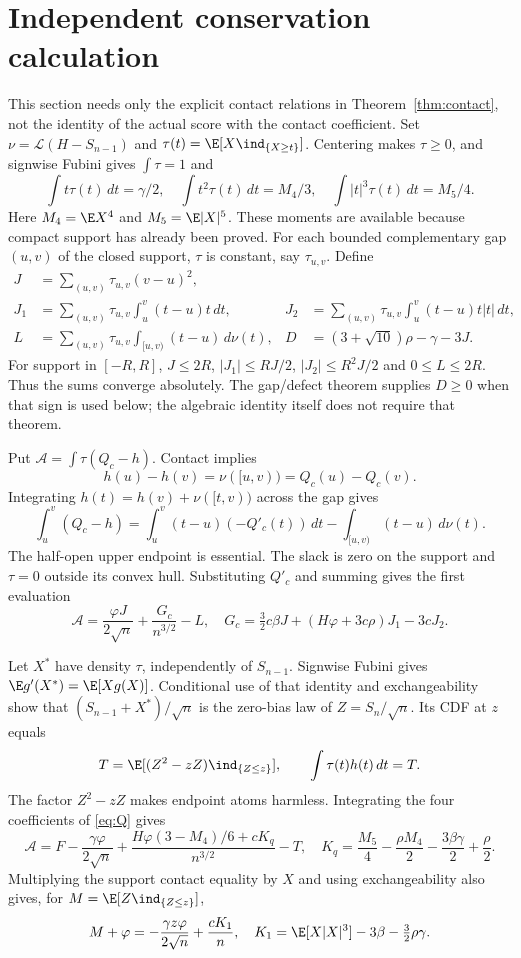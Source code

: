 \section{Independent conservation calculation}
This section needs only the explicit contact relations in
Theorem~\ref{thm:contact}, not the identity of the actual score with the
contact coefficient. Set $\nu=\mathcal L(H-S_{n-1})$ and
$\tau(t)=\E[X\ind_{\{X\ge t\}}]$. Centering makes $\tau\ge0$, and
signwise Fubini gives $\int\tau=1$ and
\[
 \int t\tau(t)\,dt=\gamma/2,\quad
 \int t^2\tau(t)\,dt=M_4/3,\quad
 \int |t|^3\tau(t)\,dt=M_5/4.

\]
Here $M_4=\E X^4$ and $M_5=\E|X|^5$.
These moments are available because compact support has already been
proved. For each bounded complementary gap $(u,v)$ of the closed support,
$\tau$ is constant, say $\tau_{u,v}$. Define
\begin{align*}
 J&=\sum_{(u,v)}\tau_{u,v}(v-u)^2,\\
 J_1&=\sum_{(u,v)}\tau_{u,v}\int_u^v(t-u)t\,dt,
 &J_2&=\sum_{(u,v)}\tau_{u,v}\int_u^v(t-u)t|t|\,dt,\\
 L&=\sum_{(u,v)}\tau_{u,v}\int_{[u,v)}(t-u)\,d\nu(t),
 &D&=(3+\sqrt{10})\rho-\gamma-3J.
\end{align*}
For support in $[-R,R]$, $J\le2R$, $|J_1|\le RJ/2$,
$|J_2|\le R^2J/2$ and $0\le L\le2R$. Thus the sums converge absolutely.
The gap/defect theorem supplies $D\ge0$ when that sign is used below;
the algebraic identity itself does not require that theorem.

Put $\mathcal A=\int\tau(Q_c-h)$. Contact implies
\[
 h(u)-h(v)=\nu([u,v))=Q_c(u)-Q_c(v).
\]
Integrating $h(t)=h(v)+\nu([t,v))$ across the gap gives
\[
 \int_u^v(Q_c-h)
 =\int_u^v(t-u)(-Q'_c(t))\,dt-\int_{[u,v)}(t-u)\,d\nu(t).
\]
The half-open upper endpoint is essential. The slack is zero on the
support and $\tau=0$ outside its convex hull. Substituting $Q'_c$ and
summing gives the first evaluation
\begin{equation}\label{eq:first}
 \mathcal A=\frac{\varphi J}{2\sqrt n}+\frac{G_c}{n^{3/2}}-L,
 \quad G_c=\tfrac32c\beta J+(H\varphi+3c\rho)J_1-3cJ_2.
\end{equation}

Let $X^*$ have density $\tau$, independently of $S_{n-1}$. Signwise
Fubini gives $\E g'(X^*)=\E[Xg(X)]$. Conditional use of that identity
and exchangeability show that $(S_{n-1}+X^*)/\sqrt n$ is the zero-bias
law of $Z=S_n/\sqrt n$. Its CDF at $z$ equals
\[
 T=\E[(Z^2-zZ)\ind_{\{Z\le z\}}],
 \qquad\int\tau(t)h(t)\,dt=T.
\]
The factor $Z^2-zZ$ makes endpoint atoms harmless. Integrating the four
coefficients of \eqref{eq:Q} gives
\begin{equation}\label{eq:second}
 \mathcal A=F-\frac{\gamma\varphi}{2\sqrt n}
 +\frac{H\varphi(3-M_4)/6+cK_q}{n^{3/2}}-T,
 \quad K_q=\frac{M_5}4-\frac{\rho M_4}2-\frac{3\beta\gamma}2+\frac\rho2.
\end{equation}
Multiplying the support contact equality by $X$ and using exchangeability
also gives, for $M=\E[Z\ind_{\{Z\le z\}}]$,
\begin{equation}\label{eq:firstmoment}
 M+\varphi=-\frac{\gamma z\varphi}{2\sqrt n}+\frac{cK_1}{n},
 \quad K_1=\E[X|X|^3]-3\beta-\tfrac32\rho\gamma.
\end{equation}

